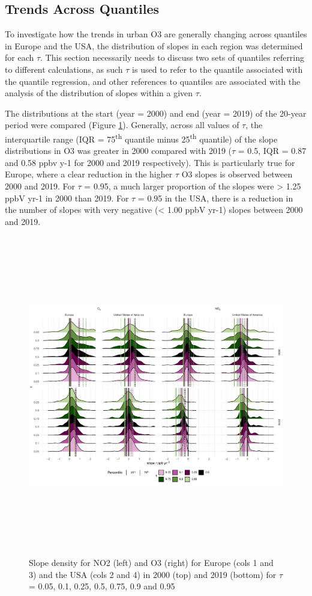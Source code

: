 \documentclass[journal abbreviation, manuscript]{copernicus}
\begin{document}
\subsection{Trends Across Quantiles} \label{sect:trends_across_quantiles}

To investigate how the trends in urban O3 are generally changing across quantiles in Europe and the USA, the distribution of slopes in each region was determined for each $\tau$. This section necessarily needs to discuss two sets of quantiles referring to different calculations, as such $\tau$ is used to refer to the quantile associated with the quantile regression, and other references to quantiles are associated with the analysis of the distribution of slopes within a given $\tau$.

The distributions at the start (year = 2000) and end (year = 2019) of the 20-year period were compared (Figure \ref{fig:ridgeplot}). Generally, across all values of $\tau$, the interquartile range (IQR = 75\textsuperscript{th} quantile minus 25\textsuperscript{th} quantile) of the slope distributions in O3 was greater in 2000 compared with 2019 ($\tau$ = 0.5, IQR = 0.87 and 0.58 ppbv y-1 for 2000 and 2019 respectively). This is particularly true for Europe, where a clear reduction in the higher $\tau$ O3 slopes is observed between 2000 and 2019. For $\tau$ = 0.95, a much larger proportion of the slopes were > 1.25 ppbV yr-1 in 2000 than 2019. For $\tau$ = 0.95 in the USA, there is a reduction in the number of slopes with very negative (< 1.00 ppbV yr-1) slopes between 2000 and 2019.

\begin{figure}
\includegraphics[height=14cm]{figures/f6_ridgelines.pdf}
\caption{Slope density for NO2 (left) and O3 (right) for Europe (cols 1 and 3) and the USA (cols 2 and 4) in 2000 (top) and 2019 (bottom) for $\tau$ = 0.05, 0.1, 0.25, 0.5, 0.75, 0.9 and 0.95}
\label{fig:ridgeplot}
\end{figure}
\end{document}
